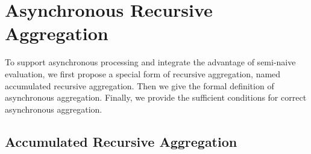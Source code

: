 

\section{Asynchronous Recursive Aggregation}

To support asynchronous processing and integrate the advantage of semi-naive evaluation, we first propose a special form of recursive aggregation, named accumulated recursive aggregation. Then we give the formal definition of asynchronous aggregation. Finally, we provide the sufficient conditions for correct asynchronous aggregation.

\subsection{Accumulated Recursive Aggregation}
\label{sec:async:accrec}

